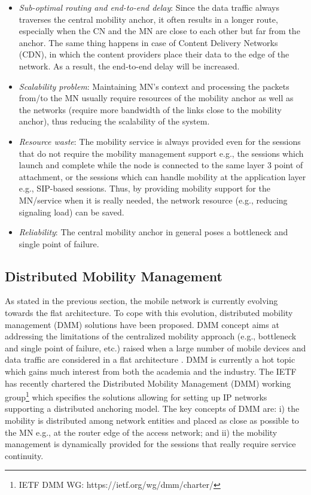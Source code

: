 \begin{itemize}
\item \textit{Sub-optimal routing and end-to-end delay}: Since the data traffic always traverses the central mobility anchor, it often results in a longer route, especially when the CN and the MN are close to each other but far from the anchor. The same thing happens in case of Content Delivery Networks (CDN), in which the content providers place their data to the edge of the network. As a result, the end-to-end delay will be increased. 
\item \textit{Scalability problem}: Maintaining MN's context and processing the packets from/to the MN usually require resources of the mobility anchor as well as the networks (require more bandwidth of the links close to the mobility anchor), thus reducing the scalability of the system.  
\item \textit{Resource waste}: The mobility service is always provided even for the sessions that do not require the mobility management support e.g., the sessions which launch and complete while the node is connected to the same layer 3 point of attachment, or the sessions which can handle mobility at the application layer e.g.,  SIP-based sessions. Thus, by providing mobility support for the MN/service when it is really needed, the network resource (e.g., reducing signaling load) can be saved.   
\item \textit{Reliability}: The central mobility anchor in general poses a bottleneck and single point of failure.  
\end{itemize}

\subsection{Distributed Mobility Management}
As stated in the previous section, the mobile network is currently evolving towards the flat architecture. To cope with this evolution, distributed mobility management (DMM) solutions have been proposed. DMM concept aims at addressing the limitations of the centralized mobility approach (e.g., bottleneck and single point of failure, etc.) raised when a large number of mobile devices and data traffic are considered in a flat architecture \cite{DMM_issues,DMM_problem_statement}. DMM is currently a hot topic which gains much interest from both the academia and the industry. The IETF has recently chartered the Distributed Mobility Management (DMM) working group\footnote{IETF DMM WG: https://ietf.org/wg/dmm/charter/} which specifies the solutions allowing for setting up IP networks supporting a distributed anchoring model. The key concepts of DMM are: i) the mobility is distributed among network entities and placed as close as possible to the MN e.g., at the router edge of the access network; and ii) the mobility management is dynamically provided for the sessions that really require service continuity. 

